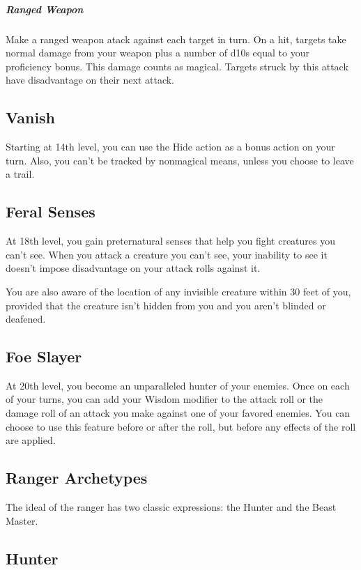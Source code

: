 \subparagraph*{Ranged Weapon} Make a ranged weapon atack against each target in turn. On a hit, targets take normal damage from your weapon plus a number of d10s equal to your proficiency bonus. This damage counts as magical. Targets struck by this attack have disadvantage on their next attack.

\subsection{Vanish}

Starting at 14th level, you can use the Hide action as a bonus action on your turn. Also, you can't be tracked by nonmagical means, unless you choose to leave a trail.

\subsection{Feral Senses}

At 18th level, you gain preternatural senses that help you fight creatures you can't see. When you attack a creature you can't see, your inability to see it doesn't impose disadvantage on your attack rolls against it.

You are also aware of the location of any invisible creature within 30 feet of you, provided that the creature isn't hidden from you and you aren't blinded or deafened.

\subsection{Foe Slayer}
At 20th level, you become an unparalleled hunter of your enemies. Once on each of your turns, you can add your Wisdom modifier to the attack roll or the damage roll of an attack you make against one of your favored enemies. You can choose to use this feature before or after the roll, but before any effects of the roll are applied.

\subsection{Ranger Archetypes}%

The ideal of the ranger has two classic expressions: the Hunter and the Beast Master.

\subsection{Hunter}

